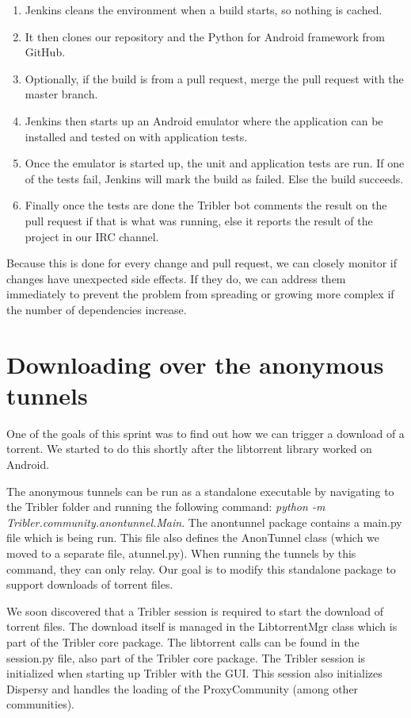 		\begin{enumerate}
			\item Jenkins cleans the environment when a build starts, so nothing is cached.
			\item It then clones our repository and the Python for Android framework from GitHub.
			\item Optionally, if the build is from a pull request, merge the pull request with the master branch.
			\item Jenkins then starts up an Android emulator where the application can be installed and tested on with application tests.
			\item Once the emulator is started up, the unit and application tests are run. If one of the tests fail, Jenkins will mark the build as failed. Else the build succeeds.
			\item Finally once the tests are done the Tribler bot comments the result on the pull request if that is what was running, else it reports the result of the project in our IRC channel.
		\end{enumerate} 
		
		Because this is done for every change and pull request, we can closely monitor if changes have unexpected side effects. If they do, we can address them immediately to prevent the problem from spreading or growing more complex if the number of dependencies increase.
		
	\section{Downloading over the anonymous tunnels}
	One of the goals of this sprint was to find out how we can trigger a download of a torrent. We started to do this shortly after the libtorrent library worked on Android.
	
	The anonymous tunnels can be run as a standalone executable by navigating to the Tribler folder and running the following command: \emph{python -m Tribler.community.anontunnel.Main}. The anontunnel package contains a main.py file which is being run. This file also defines the AnonTunnel class (which we moved to a separate file, atunnel.py). When running the tunnels by this command, they can only relay. Our goal is to modify this standalone package to support downloads of torrent files.
	
	We soon discovered that a Tribler session is required to start the download of torrent files. The download itself is managed in the LibtorrentMgr class which is part of the Tribler core package. The libtorrent calls can be found in the session.py file, also part of the Tribler core package. The Tribler session is initialized when starting up Tribler with the GUI. This session also initializes Dispersy and handles the loading of the ProxyCommunity (among other communities).
	
